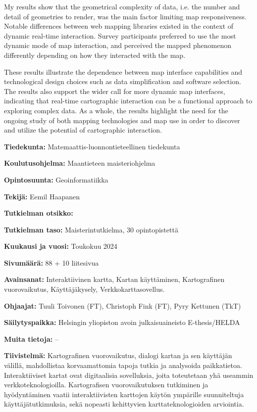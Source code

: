 \begin{spacing}{1}
My results show that the geometrical complexity of data,
i.e. the number and detail of geometries to render,
was the main factor limiting map responsiveness.
Notable differences between web mapping libraries existed
in the context of dynamic real-time interaction.
Survey participants preferred to use the most dynamic mode of map interaction,
and perceived the mapped phenomenon differently depending on how they interacted with the map.

These results illustrate the dependence between map interface capabilities and technological design choices
such as data simplification and software selection.
The results also support the wider call for more dynamic map interfaces,
indicating that real-time cartographic interaction can be a functional approach to exploring complex data.
As a whole, the results highlight the need for the ongoing study of both mapping technologies and map use
in order to discover and utilize the potential of cartographic interaction.

\newpage

\textbf{Tiedekunta:} Matemaattis-luonnontieteellinen tiedekunta

\textbf{Koulutusohjelma:} Maantieteen maisteriohjelma

\textbf{Opintosuunta:} Geoinformatiikka

\textbf{Tekijä:} Eemil Haapanen

\textbf{Tutkielman otsikko:} \myfinnishtitle

\textbf{Tutkielman taso:} Maisterintutkielma, 30 opintopistettä

\textbf{Kuukausi ja vuosi:} Toukokuu 2024

\textbf{Sivumäärä:} 88 + 10 liitesivua

\textbf{Avainsanat:}
Interaktiivinen kartta,
Kartan käyttäminen,
Kartografinen vuorovaikutus,
Käyttäjäkysely,
Verkkokarttasovellus.

\textbf{Ohjaajat:} Tuuli Toivonen (FT), Christoph Fink (FT), Pyry Kettunen (TkT)

\textbf{Säilytyspaikka:} Helsingin yliopiston avoin julkaisuaineisto E-thesis/HELDA

\textbf{Muita tietoja:} --

\textbf{Tiivistelmä:}
Kartografinen vuorovaikutus, dialogi kartan ja sen käyttäjän välillä, mahdollistaa
korvaamattomia tapoja tutkia ja analysoida paikkatietoa.
Interaktiiviset kartat ovat digitaalisia sovelluksia,
joita toteutetaan yhä useammin verkkoteknologioilla.
Kartografisen vuorovaikutuksen tutkiminen ja hyödyntäminen vaatii
interaktiivisten karttojen käytön ympärille suunniteltuja käyttäjätutkimuksia,
sekä nopeasti kehittyvien karttateknologioiden arviointia.


\end{spacing}
